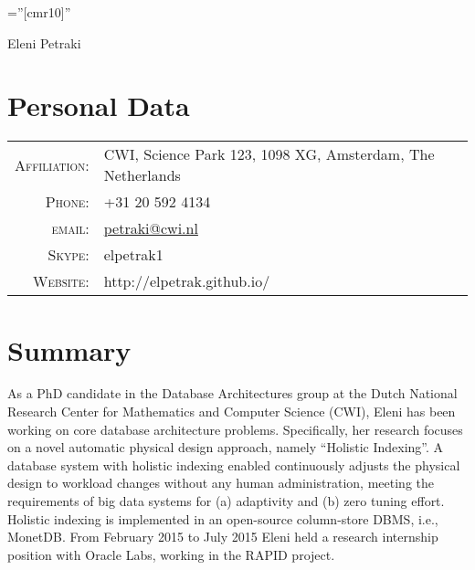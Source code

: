 \documentclass[a4paper,10pt]{article}
\begin{document}

\pagestyle{empty} %

\font\fb=''[cmr10]'' %

\par{\centering
		{\Huge Eleni Petraki
	}\bigskip\par}

\section{Personal Data}

\begin{tabular}{rl}
    \textsc{Affiliation:}   & CWI, Science Park 123, 1098 XG, Amsterdam, The Netherlands \\
    \textsc{Phone:}     & +31 20 592 4134\\
    \textsc{email:}     & \href{mailto:petraki@cwi.nl}{petraki@cwi.nl}\\
    \textsc{Skype:}     & elpetrak1\\
    \textsc{Website:}   & http://elpetrak.github.io/
\end{tabular}

\section{Summary}
As a PhD candidate in the Database Architectures group at the Dutch National Research Center for Mathematics and Computer Science (CWI), Eleni has been working on core database architecture problems. Specifically, her research focuses on a novel automatic physical design approach, namely ``Holistic Indexing''. A database system with holistic indexing enabled continuously adjusts the physical design to workload changes without any human administration, meeting the requirements of big data systems for (a) adaptivity and (b) zero tuning effort. Holistic indexing is implemented in an open-source column-store DBMS, i.e., MonetDB. From February 2015 to July 2015 Eleni held a research internship position with Oracle Labs, working in the RAPID project.
\end{document}
